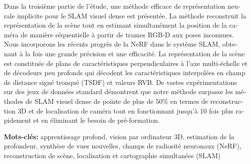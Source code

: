 \begin{otherlanguage}{french}
\vspace{2ex}

Dans la troisième partie de l'étude, une méthode efficace de représentation neurale implicite pour le SLAM visuel dense est présentée. La méthode reconstruit la représentation de la scène tout en estimant simultanément la position de la caméra de manière séquentielle à partir de trames RGB-D aux poses inconnues. Nous incorporons les récents progrès de la NeRF dans le système SLAM, obtenant à la fois une grande précision et une efficacité. La représentation de la scène est constituée de plans de caractéristiques perpendiculaires à l'axe multi-échelle et de décodeurs peu profonds qui décodent les caractéristiques interpolées en champ de distance signé tronqué (TSDF) et valeurs RVB. De vastes expérimentations sur des jeux de données standard démontrent que notre méthode surpasse les méthodes de SLAM visuel dense de pointe de plus de 50\% en termes de reconstruction 3D et de localisation de caméra tout en fonctionnant jusqu'à 10 fois plus rapidement et en éliminant le besoin de pré-formation.

\vspace{2ex}
\textbf{Mots-clés:} apprentissage profond, vision par ordinateur 3D, estimation de la profondeur, synthèse de vues nouvelles, champs de radiosité neuronaux (NeRF), reconstruction de scène, localisation et cartographie simultanées (SLAM)

\end{otherlanguage}


